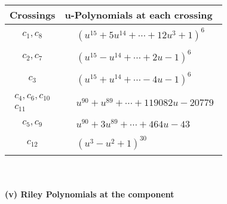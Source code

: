\documentclass[1p]{elsarticle_modified}
\theoremstyle{definition}
\begin{document}
\begin{tabular}{m{50pt}|m{274pt}}
Crossings & \hspace{64pt}u-Polynomials at each crossing \\
\hline $$\begin{aligned}c_{1},c_{8}\end{aligned}$$&$\begin{aligned}
&(u^{15}+5 u^{14}+\cdots+12 u^3+1)^{6}
\end{aligned}$\\
\hline $$\begin{aligned}c_{2},c_{7}\end{aligned}$$&$\begin{aligned}
&(u^{15}- u^{14}+\cdots+2 u-1)^{6}
\end{aligned}$\\
\hline $$\begin{aligned}c_{3}\end{aligned}$$&$\begin{aligned}
&(u^{15}+u^{14}+\cdots-4 u-1)^{6}
\end{aligned}$\\
\hline $$\begin{aligned}c_{4},c_{6},c_{10}\\c_{11}\end{aligned}$$&$\begin{aligned}
&u^{90}+u^{89}+\cdots+119082 u-20779
\end{aligned}$\\
\hline $$\begin{aligned}c_{5},c_{9}\end{aligned}$$&$\begin{aligned}
&u^{90}+3 u^{89}+\cdots+464 u-43
\end{aligned}$\\
\hline $$\begin{aligned}c_{12}\end{aligned}$$&$\begin{aligned}
&(u^3- u^2+1)^{30}
\end{aligned}$\\
\hline
\end{tabular}\\~\\
\newpage\renewcommand{\arraystretch}{1}
\flushleft \textbf{(v) Riley Polynomials at the component}\newline \\
\end{document}
